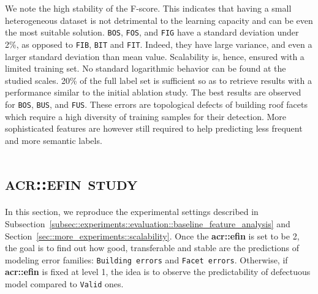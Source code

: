         We note the high stability of the F-score.
        This indicates that having a small heterogeneous dataset is not detrimental to the learning capacity and can be even the most suitable solution.
        \texttt{BOS}, \texttt{FOS}, and \texttt{FIG} have a standard deviation under 2\%, as opposed to \texttt{FIB}, \texttt{BIT} and \texttt{FIT}.
        Indeed, they have large variance, and even a larger standard deviation than mean value.
        Scalability is, hence, ensured with a limited training set.
        No standard logarithmic behavior can be found at the studied scales.
        20\% of the full label set is sufficient so as to retrieve results with a performance similar to the initial ablation study.
        The best results are observed for \texttt{BOS}, \texttt{BUS}, and \texttt{FUS}.
        These errors are topological defects of building roof facets which require a high diversity of training samples for their detection.
        More sophisticated features are however still required to help predicting less frequent and more semantic labels.
    
\section{\textsc{\acrlong*{acr::efin} study}}
    \label{sec::more_experiments::finesse}
    In this section, we reproduce the experimental settings described in Subsection~\ref{subsec::experiments::evaluation::baseline_feature_analysis} and Section~\ref{sec::more_experiments::scalability}.
    Once the \textbf{\gls{acr::efin}} is set to be 2, the goal is to find out how good, transferable and stable are the predictions of modeling error families: \texttt{Building errors} and \texttt{Facet errors}.
    Otherwise, if \textbf{\gls{acr::efin}} is fixed at level 1, the idea is to observe the predictability of defectuous model compared to \texttt{Valid} ones.
    
